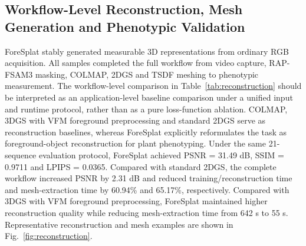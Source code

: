 \documentclass[a4paper]{cas-sc}
\begin{document}
\subsection{Workflow-Level Reconstruction, Mesh Generation and Phenotypic Validation}\label{sec:workflow-validation-results}

ForeSplat stably generated measurable 3D representations from ordinary RGB acquisition. All samples completed the full workflow from video capture, RAP-FSAM3 masking, COLMAP, 2DGS and TSDF meshing to phenotypic measurement. The workflow-level comparison in Table~\ref{tab:reconstruction} should be interpreted as an application-level baseline comparison under a unified input and runtime protocol, rather than as a pure loss-function ablation. COLMAP, 3DGS with VFM foreground preprocessing and standard 2DGS serve as reconstruction baselines, whereas ForeSplat explicitly reformulates the task as foreground-object reconstruction for plant phenotyping. Under the same 21-sequence evaluation protocol, ForeSplat achieved PSNR = 31.49 dB, SSIM = 0.9711 and LPIPS = 0.0365. Compared with standard 2DGS, the complete workflow increased PSNR by 2.31 dB and reduced training/reconstruction time and mesh-extraction time by 60.94\% and 65.17\%, respectively. Compared with 3DGS with VFM foreground preprocessing, ForeSplat maintained higher reconstruction quality while reducing mesh-extraction time from 642 s to 55 s. Representative reconstruction and mesh examples are shown in Fig.~\ref{fig:reconstruction}.
\end{document}
